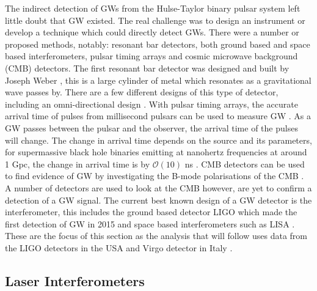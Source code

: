The indirect detection of \glspl{GW} from the Hulse-Taylor binary
pulsar system \citep{weisberg1981GravitationalWaves} left little doubt that \gls{GW} existed.  The
real challenge was to design an instrument or develop a technique which could directly detect
\glspl{GW}. There were a number or proposed methods, notably: resonant bar detectors, both
ground based and space based interferometers, pulsar timing arrays and cosmic microwave background (CMB)
detectors. The first resonant bar detector was designed and built by Joseph
Weber \citep{weber1966ObservationThermal}, this is a large cylinder of metal
which resonates as a gravitational wave passes by.  There are a few different designs
of this type of detector, including an omni-directional design
\citep{dewaard2003MiniGRAILFirst}. 
With pulsar timing arrays, the accurate arrival time of pulses
from millisecond pulsars can be used to measure \gls{GW}
\citep{hobbs2017GravitationalWave}. As a \gls{GW} passes between the pulsar and
the observer, the arrival time of the pulses will change. The change in arrival time depends on the source and its parameters, for supermassive black hole binaries emitting at nanohertz frequencies at around 1 Gpc, the change in arrival time is by $\mathcal{O}(10)$ ns \citep{hobbs2017GravitationalWave}.  \gls{CMB} detectors can be used to find evidence of \gls{GW} by investigating the B-mode polarisations of the \gls{CMB}
\citep{ade2018ConstraintsPrimordial}. A number of
detectors are used to look at the \gls{CMB} however, are yet to
confirm a detection of a \gls{GW} signal.  
The current best known design of a \gls{GW} detector is the interferometer, this includes the ground based detector \gls{LIGO} \citep{aasi2015AdvancedLIGO}
which made the first detection of \gls{GW} in 2015
\citep{abbott2016ObservationGravitational} and space based interferometers such as \gls{LISA} \citep{danzmann1996LISALaser}.  These are the focus of this
section as the analysis that will follow uses data from the \gls{LIGO}
detectors in the USA \citep{abbott2009LIGOLaser,aasi2015AdvancedLIGO} and Virgo
detector in Italy
\citep{acernese2015AdvancedVirgo,acernese2008StatusVirgo}.

\subsection{\label{intro:detector:ligo}Laser Interferometers}

